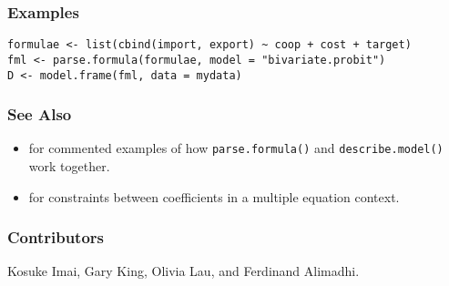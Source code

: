\subsubsection{Examples}
\begin{verbatim}
formulae <- list(cbind(import, export) ~ coop + cost + target)
fml <- parse.formula(formulae, model = "bivariate.probit")
D <- model.frame(fml, data = mydata)
\end{verbatim}

\subsubsection{See Also}
\begin{itemize}
  \item {} for commented examples of how {\tt parse.formula()}
and {\tt describe.model()} work together.  
  \item {} for constraints between coefficients in a multiple
equation context.  
\end{itemize}

\subsubsection{Contributors}

Kosuke Imai, Gary King, Olivia Lau, and Ferdinand Alimadhi.

